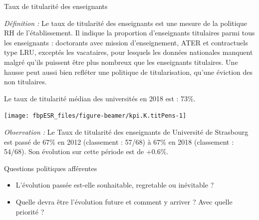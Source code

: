 \documentclass[
  8pt,
  french,
  ignorenonframetext,
  landscape]{beamer}
\providecommand{\tightlist}{%
  \setlength{\itemsep}{0pt}\setlength{\parskip}{0pt}}
\begin{document}
\begin{frame}{Taux de titularité des enseignants}
\protect\hypertarget{taux-de-titularituxe9-des-enseignants}{}

\begin{footnotesize}

\emph{Définition :} Le taux de titularité des enseignants est une mesure
de la politique RH de l'établissement. Il indique la proportion
d'enseignants titulaires parmi tous les enseignants : doctorants avec
mission d'enseignement, ATER et contractuels type LRU, exceptés les
vacataires, pour lesquels les données nationales manquent malgré qu'ils
puissent être plus nombreux que les enseignants titulaires. Une hausse
peut aussi bien refléter une politique de titularisation, qu'une
éviction des non titulaires.

\end{footnotesize}

Le taux de titularité médian des universités en 2018 est : 73\%.

\begin{center}\texttt{[image: fbpESR\_files/figure-beamer/kpi.K.titPens-1]} \end{center}

\emph{Observation :} Le Taux de titularité des enseignants de Université
de Strasbourg est passé de 67\% en 2012 (classement : 57/68) à 67\% en
2018 (classement : 54/68). Son évolution sur cette période est de
+0.6\%.

\begin{block}{Questions politiques afférentes}

\begin{itemize}
\tightlist
\item
  L'évolution passée est-elle souhaitable, regretable ou inévitable ?
\item
  Quelle devra être l'évolution future et comment y arriver ? Avec
  quelle priorité ?
\end{itemize}

\end{block}

\end{frame}
\end{document}
